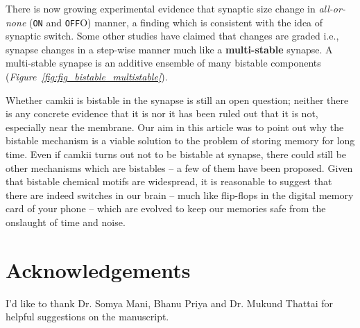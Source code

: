 \documentclass[]{resonance}
\newcommand\Fig[1]{\textit{Figure~\ref{#1}}}
\begin{document}
There is now growing experimental evidence that synaptic size change in
\textit{all-or-none} (\texttt{ON} and \texttt{OFF}O) manner, a finding which is
consistent with the idea of synaptic switch. Some other studies have claimed
that changes are graded i.e., synapse changes in a step-wise manner much like a
\textbf{multi-stable} synapse. A multi-stable synapse is an additive ensemble of
many bistable components (\Fig{fig:fig_bistable_multistable}).


Whether \gls{camkii} is bistable in the synapse is still an open question;
neither there is any concrete evidence that it is nor it has been ruled out that
it is not, especially near the membrane. Our aim in this article was to point
out why the bistable mechanism is a viable solution to the problem of storing memory
for long time. Even if \gls{camkii} turns out not to be bistable at synapse,
there could still be other mechanisms which are bistables -- a few of them have
been proposed. Given that bistable chemical motifs are widespread, it is
reasonable to suggest that there are indeed switches in our brain -- much like
flip-flops in the digital memory card of your phone -- which are evolved to keep
our memories safe from the onslaught of time and noise.


\section*{Acknowledgements} I'd like to thank Dr. Somya Mani, Bhanu Priya and
Dr. Mukund Thattai for helpful suggestions on the manuscript. 

\vspace{3mm}
\end{document}
